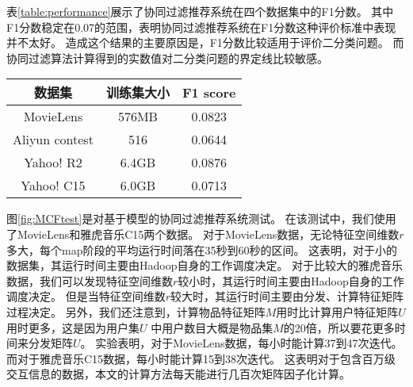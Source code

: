 表\ref{table:performance}展示了协同过滤推荐系统在四个数据集中的F1分数。
其中F1分数稳定在0.07的范围，表明协同过滤推荐系统在F1分数这种评价标准中表现并不太好。
造成这个结果的主要原因是，F1分数比较适用于评价二分类问题。
而协同过滤算法计算得到的实数值对二分类问题的界定线比较敏感。
\begin{center}
\label{table:performance}
\begin{tabular}{c|c|c}
 \hline
数据集 & 训练集大小 & F1 score \\ \hline
MovieLens & 576MB & 0.0823 \\ \hline
Aliyun contest & 516 & 0.0644 \\ \hline
Yahoo! R2 & 6.4GB & 0.0876 \\ \hline
Yahoo! C15 & 6.0GB & 0.0713 \\ \hline
\end{tabular}
\end{center}
\pgfplotsset{compat=1.13}
\begin{center}
\label{fig:MCFtest}
\end{center}

图\ref{fig:MCFtest}是对基于模型的协同过滤推荐系统测试。
在该测试中，我们使用了MovieLens和雅虎音乐C15两个数据。
对于MovieLens数据，无论特征空间维数$r$多大，每个map阶段的平均运行时间落在35秒到60秒的区间。
这表明，对于小的数据集，其运行时间主要由Hadoop自身的工作调度决定。
对于比较大的雅虎音乐数据，我们可以发现特征空间维数$r$较小时，其运行时间主要由Hadoop自身的工作调度决定。
但是当特征空间维数$r$较大时，其运行时间主要由分发、计算特征矩阵过程决定。
另外，我们还注意到，计算物品特征矩阵$M$用时比计算用户特征矩阵$U$用时更多，这是因为用户集$U$
中用户数目大概是物品集$M$的20倍，所以要花更多时间来分发矩阵$U$。
实验表明，对于MovieLens数据，每小时能计算37到47次迭代。而对于雅虎音乐C15数据，每小时能计算15到38次迭代。
这表明对于包含百万级交互信息的数据，本文的计算方法每天能进行几百次矩阵因子化计算。

